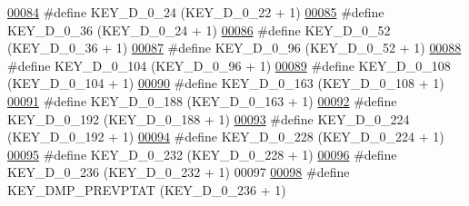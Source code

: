 \begin{DoxyCode}
\hypertarget{dmp_key_8h_source.tex_l00084}{}\hyperlink{dmp_key_8h_a831c958c87b23c6216e8385cda7de3b6}{00084} \textcolor{preprocessor}{#define KEY\_D\_0\_24                  (KEY\_D\_0\_22 + 1)}
\hypertarget{dmp_key_8h_source.tex_l00085}{}\hyperlink{dmp_key_8h_a6bfccb29906ebc85dfa35e9c88e15b9d}{00085} \textcolor{preprocessor}{#define KEY\_D\_0\_36                  (KEY\_D\_0\_24 + 1)}
\hypertarget{dmp_key_8h_source.tex_l00086}{}\hyperlink{dmp_key_8h_a326762aac6aaf7e3aac39556229bb999}{00086} \textcolor{preprocessor}{#define KEY\_D\_0\_52                  (KEY\_D\_0\_36 + 1)}
\hypertarget{dmp_key_8h_source.tex_l00087}{}\hyperlink{dmp_key_8h_a80b93be0fea044def553e18670d5032d}{00087} \textcolor{preprocessor}{#define KEY\_D\_0\_96                  (KEY\_D\_0\_52 + 1)}
\hypertarget{dmp_key_8h_source.tex_l00088}{}\hyperlink{dmp_key_8h_a35d749f51ec4fcbf2abd7cc2c4ea5a2d}{00088} \textcolor{preprocessor}{#define KEY\_D\_0\_104                 (KEY\_D\_0\_96 + 1)}
\hypertarget{dmp_key_8h_source.tex_l00089}{}\hyperlink{dmp_key_8h_a67f29e65b6421d7d8c750389508c904d}{00089} \textcolor{preprocessor}{#define KEY\_D\_0\_108                 (KEY\_D\_0\_104 + 1)}
\hypertarget{dmp_key_8h_source.tex_l00090}{}\hyperlink{dmp_key_8h_aa062d41f202bcb4dc036c2f65115a169}{00090} \textcolor{preprocessor}{#define KEY\_D\_0\_163                 (KEY\_D\_0\_108 + 1)}
\hypertarget{dmp_key_8h_source.tex_l00091}{}\hyperlink{dmp_key_8h_a0cdb5b848e5771c1e18e11513628806d}{00091} \textcolor{preprocessor}{#define KEY\_D\_0\_188                 (KEY\_D\_0\_163 + 1)}
\hypertarget{dmp_key_8h_source.tex_l00092}{}\hyperlink{dmp_key_8h_ace2bc6282ca8c6e3a226d81bc0a4f2f1}{00092} \textcolor{preprocessor}{#define KEY\_D\_0\_192                 (KEY\_D\_0\_188 + 1)}
\hypertarget{dmp_key_8h_source.tex_l00093}{}\hyperlink{dmp_key_8h_ac793f65090ac62fdc8821cf59fb1ec5a}{00093} \textcolor{preprocessor}{#define KEY\_D\_0\_224                 (KEY\_D\_0\_192 + 1)}
\hypertarget{dmp_key_8h_source.tex_l00094}{}\hyperlink{dmp_key_8h_adcdba2672a0bf9d1c519c5101351160c}{00094} \textcolor{preprocessor}{#define KEY\_D\_0\_228                 (KEY\_D\_0\_224 + 1)}
\hypertarget{dmp_key_8h_source.tex_l00095}{}\hyperlink{dmp_key_8h_a7c10b1c90336275cd7055e9e7eb71f53}{00095} \textcolor{preprocessor}{#define KEY\_D\_0\_232                 (KEY\_D\_0\_228 + 1)}
\hypertarget{dmp_key_8h_source.tex_l00096}{}\hyperlink{dmp_key_8h_a7f3b517a452bb2eb6170a65153042224}{00096} \textcolor{preprocessor}{#define KEY\_D\_0\_236                 (KEY\_D\_0\_232 + 1)}
00097 
\hypertarget{dmp_key_8h_source.tex_l00098}{}\hyperlink{dmp_key_8h_a4f1ffa03a5aaadae912f77bea3aa1e45}{00098} \textcolor{preprocessor}{#define KEY\_DMP\_PREVPTAT            (KEY\_D\_0\_236 + 1)}

\end{DoxyCode}
